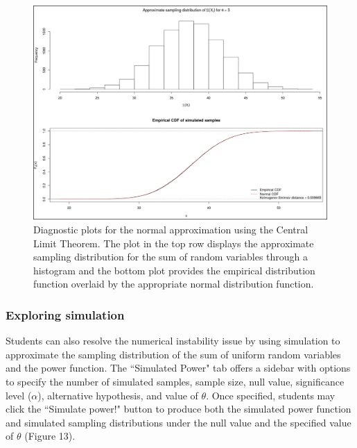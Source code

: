 \documentclass{TISE}
\begin{document}
\begin{figure}[H]
	\centering
	\includegraphics[width=\textwidth]{fig12.png}
	\caption{Diagnostic plots for the normal approximation using the Central Limit Theorem. The plot in the top row displays the approximate sampling distribution for the sum of random variables through a histogram and the bottom plot provides the empirical distribution function overlaid by the appropriate normal distribution function.}
\end{figure}

\subsubsection{Exploring simulation}

Students can also resolve the numerical instability issue by using simulation to approximate the sampling distribution of the sum of uniform random variables and the power function. The ``Simulated Power" tab offers a sidebar with options to specify the number of simulated samples, sample size, null value, significance level ($\alpha$), alternative hypothesis, and value of $\theta$. Once specified, students may click the ``Simulate power!" button to produce both the simulated power function and simulated sampling distributions under the null value and the specified value of $\theta$ (Figure 13).
\end{document}

